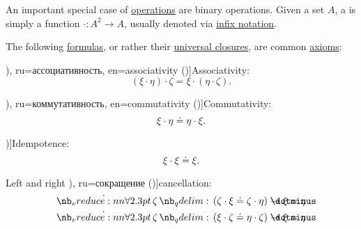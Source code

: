 \begin{definition}\label{def:binary_operation}
  An important special case of \hyperref[def:operation_on_set]{operations} are binary operations. Given a set \( A \), a  is simply a function \( \cdot: A^2 \to A \), usually denoted via \hyperref[rem:first_order_formula_conventions/infix]{infix notation}.

  The following \hyperref[def:first_order_syntax/formula]{formulas}, or rather their \hyperref[def:universal_closure]{universal closures}, are common \hyperref[def:first_order_theory/axiomatized]{axioms}:
  \begin{thmenum}
     \term[bg=асоциативност (\cite[11]{ГеновМиховскиМоллов1991}), ru=ассоциативность, en=associativity (\cite[41]{Savage1998})]{Associativity}:
    \begin{equation}\label{eq:def:binary_operation/associative}
      (\xi \cdot \eta) \cdot \zeta = \xi \cdot (\eta \cdot \zeta).
    \end{equation}

     \term[bg=комутативност (\cite[11]{ГеновМиховскиМоллов1991}), ru=коммутативность, en=commutativity (\cite[3]{Golan2010})]{Commutativity}:
    \begin{equation}\label{eq:def:binary_operation/commutative}
      \xi \cdot \eta \doteq \eta \cdot \xi.
    \end{equation}

     \term[ru=идемпотентность, en=idempotence (\cite[65]{Rosen1999})]{Idempotence}:
    \begin{equation}\label{eq:def:binary_operation/idempotent}
      \xi \cdot \xi \doteq \xi.
    \end{equation}

     Left and right \term[bg=съкращаване (\cite[77]{ГеновМиховскиМоллов1991}), ru=сокращение (\cite[\( 1.18(\varepsilon) \)]{Ляпин1960})]{cancellation}:
    \begin{align}
      \qforall \zeta (\zeta \cdot \xi \syneq \zeta \cdot \eta) \synimplies \xi = \eta
      \label{eq:def:binary_operation/cancellative/left}
      \\
      \qforall \zeta (\xi \cdot \zeta \syneq \eta \cdot \zeta) \synimplies \xi = \eta
      \label{eq:def:binary_operation/cancellative/right}
    \end{align}
  \end{thmenum}
\end{definition}

